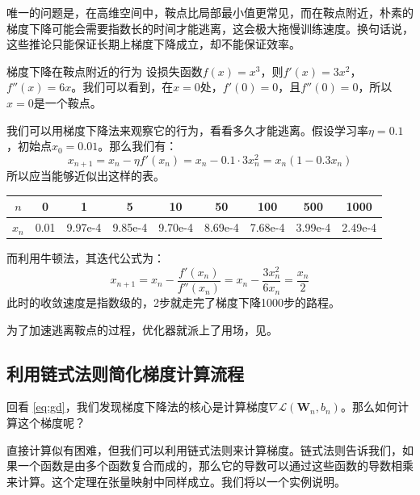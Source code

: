 唯一的问题是，在高维空间中，鞍点比局部最小值更常见，而在鞍点附近，朴素的梯度下降可能会需要指数长的时间才能逃离，这会极大拖慢训练速度\cite{schaeffer2019extendingstepsizerestrictiongradient}。换句话说，这些推论只能保证长期上梯度下降成立，却不能保证效率。

\begin{example}{梯度下降在鞍点附近的行为}{}
    设损失函数$f(x) = x^3$，则$f'(x) = 3x^2$，$f''(x) = 6x$。我们可以看到，在$x=0$处，$f'(0) = 0$，且$f''(0) = 0$，所以$x=0$是一个鞍点。

    我们可以用梯度下降法来观察它的行为，看看多久才能逃离。假设学习率$\eta = 0.1$，初始点$x_0 = 0.01$。那么我们有：
    \begin{equation}
        x_{n+1} = x_n - \eta f'(x_n) = x_n - 0.1 \cdot 3x_n^2 = x_n(1 - 0.3x_n)
    \end{equation}
    所以应当能够近似出这样的表。
    
    \begin{center}
    \begin{tabular}{c|cccccccc}
        \toprule
        $n$ & 0 & 1 & 5 & 10 & 50 & 100 & 500 & 1000 \\
        \midrule
        $x_n$ & 0.01 & 9.97e-4 & 9.85e-4 & 9.70e-4 & 8.69e-4 & 7.68e-4 & 3.99e-4 & 2.49e-4 \\
        \bottomrule
    \end{tabular}
    \end{center}

    而利用牛顿法，其迭代公式为：
    \begin{equation}
        x_{n+1} = x_n - \frac{f'(x_n)}{f''(x_n)} = x_n - \frac{3x_n^2}{6x_n} = \frac{x_n}{2}
    \end{equation}
    此时的收敛速度是指数级的，2步就走完了梯度下降1000步的路程。
\end{example}

为了加速逃离鞍点的过程，优化器就派上了用场，见。

\subsection{利用链式法则简化梯度计算流程}

回看 \eqref{eq:gd}，我们发现梯度下降法的核心是计算梯度$\nabla \mathcal{L}(\mathbf{W}_n, b_n)$。那么如何计算这个梯度呢？

直接计算似有困难，但我们可以利用链式法则来计算梯度。链式法则告诉我们，如果一个函数是由多个函数复合而成的，那么它的导数可以通过这些函数的导数相乘来计算。这个定理在张量映射中同样成立。我们将以一个实例说明。

